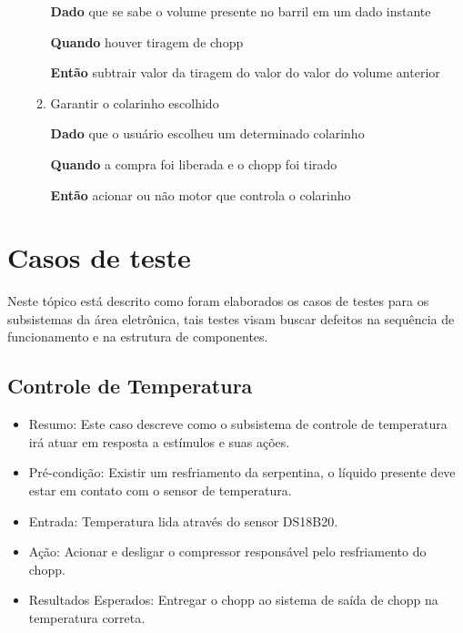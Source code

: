 \begin{enumerate}
\begin{enumerate}
\textbf{Dado} que se sabe o volume presente no barril em um dado instante

\textbf{Quando} houver tiragem de chopp

\textbf{Então} subtrair valor da tiragem do valor do valor do volume anterior



\item Garantir o colarinho escolhido

\textbf{Dado} que o usuário escolheu um determinado colarinho

\textbf{Quando} a compra foi liberada e o chopp foi  tirado

\textbf{Então} acionar ou não motor que controla o colarinho


\end{enumerate}

\end{enumerate}


\section{Casos de teste}

Neste tópico está descrito como foram elaborados os casos de testes para os subsistemas da área eletrônica, tais testes visam buscar defeitos na sequência de funcionamento e na estrutura de componentes.

\subsection{Controle de Temperatura}

\begin{itemize}
    
    \item Resumo: Este caso descreve como o subsistema de controle de temperatura irá atuar em resposta a estímulos e suas ações.

    \item Pré-condição: Existir um resfriamento da serpentina, o líquido presente deve estar em contato com o sensor de temperatura.

    \item Entrada: Temperatura lida através do sensor DS18B20.

    \item Ação: Acionar e desligar o compressor responsável pelo resfriamento do chopp.

    \item Resultados Esperados: Entregar o chopp ao sistema de saída de chopp na temperatura correta.

\end{itemize}        

